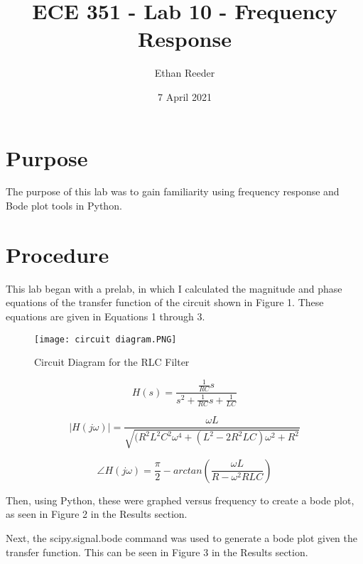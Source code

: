 \documentclass[12pt]{article}
\title{ECE 351 - Lab 10 - Frequency Response}
\author{Ethan Reeder}
\date{7 April 2021}
\begin{document}
\lstset{language=Python}

\maketitle

\newpage

\tableofcontents

\newpage

\section{Purpose}

The purpose of this lab was to gain familiarity using frequency response and Bode plot tools in Python.

\section{Procedure}

This lab began with a prelab, in which I calculated the magnitude and phase equations of the transfer function of the circuit shown in Figure 1. These equations are given in Equations 1 through 3.

\begin{figure}[h!]
    \centering
    \texttt{[image: circuit diagram.PNG]}
    \caption{Circuit Diagram for the RLC Filter}
\end{figure}

\begin{equation}
    H(s) = \frac{ \frac{1}{RC} s}{s^2 + \frac{1}{RC} s + \frac{1}{LC}}
\end{equation}

\begin{equation}
    | H(j \omega ) | = \frac{\omega L}{\sqrt{(R^2 L^2 C^2 \omega^4 + (L^2 - 2R^2 LC) \omega ^2 + R^2}}
\end{equation}

\begin{equation}
    \angle H(j \omega) = \frac{\pi}{2} - arctan(\frac{\omega L}{R - \omega ^2 R L C})
\end{equation}

Then, using Python, these were graphed versus frequency to create a bode plot, as seen in Figure 2 in the Results section.

Next, the scipy.signal.bode command was used to generate a bode plot given the transfer function. This can be seen in Figure 3 in the Results section.
\end{document}
